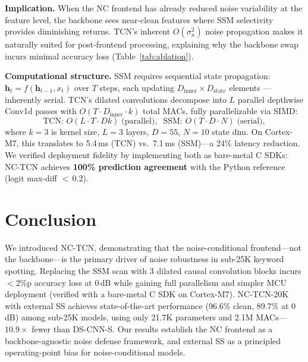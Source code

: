 \documentclass[conference]{IEEEtran}
\begin{document}
\textbf{Implication.}
When the NC frontend has already reduced noise variability at the feature level, the backbone sees near-clean features where SSM selectivity provides diminishing returns.
TCN's inherent $O(\sigma_n^2)$ noise propagation makes it naturally suited for post-frontend processing, explaining why the backbone swap incurs minimal accuracy loss (Table~\ref{tab:ablation}).

\textbf{Computational structure.}
SSM requires sequential state propagation: $\mathbf{h}_t = f(\mathbf{h}_{t-1}, x_t)$ over $T$ steps, each updating $D_{\text{inner}} \times D_{\text{state}}$ elements --- inherently serial.
TCN's dilated convolutions decompose into $L$ parallel depthwise Conv1d passes with $O(T \cdot D_{\text{inner}} \cdot k)$ total MACs, fully parallelizable via SIMD:
\begin{equation}
\text{TCN: } O(L \cdot T \cdot D k) \;\text{(parallel)}, \;\;
\text{SSM: } O(T \cdot D \cdot N) \;\text{(serial)},
\end{equation}
where $k{=}3$ is kernel size, $L{=}3$ layers, $D{=}55$, $N{=}10$ state dim.
On Cortex-M7, this translates to 5.4\,ms (TCN) vs.\ 7.1\,ms (SSM)---a 24\% latency reduction.
We verified deployment fidelity by implementing both as bare-metal C SDKs: NC-TCN achieves \textbf{100\% prediction agreement} with the Python reference (logit max-diff $<$\,0.2).

\section{Conclusion}

We introduced NC-TCN, demonstrating that the noise-conditional frontend---not the backbone---is the primary driver of noise robustness in sub-25K keyword spotting.
Replacing the SSM scan with 3 dilated causal convolution blocks incurs $<$2\%p accuracy loss at 0\,dB while gaining full parallelism and simpler MCU deployment (verified with a bare-metal C SDK on Cortex-M7).
NC-TCN-20K with external SS achieves state-of-the-art performance (96.6\% clean, 89.7\% at 0\,dB) among sub-25K models, using only 21.7K parameters and 2.1M MACs---$10.9\times$ fewer than DS-CNN-S.
Our results establish the NC frontend as a backbone-agnostic noise defense framework, and external SS as a principled operating-point bias for noise-conditional models.


\end{document}
